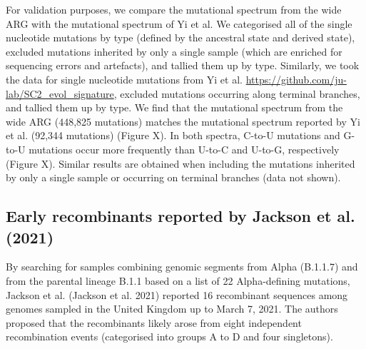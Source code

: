 \documentclass{article}
\begin{document}
For validation purposes, we compare the mutational spectrum from the wide ARG
with the mutational spectrum of Yi et al. We categorised all of the single
nucleotide mutations by type (defined by the ancestral state and derived
state), excluded mutations inherited by only a single sample (which are
enriched for sequencing errors and artefacts), and tallied them up by type.
Similarly, we took the data for single nucleotide mutations from Yi et al.
\url{https://github.com/ju-lab/SC2_evol_signature}, excluded mutations
occurring along terminal branches, and tallied them up by type. We find that
the mutational spectrum from the wide ARG (448,825 mutations) matches the
mutational spectrum reported by Yi et al. (92,344 mutations) (Figure X). In
both spectra, C-to-U mutations and G-to-U mutations occur more frequently than
U-to-C and U-to-G, respectively (Figure X). Similar results are obtained when
including the mutations inherited by only a single sample or occurring on
terminal branches (data not shown).


\subsection{Early recombinants reported by Jackson et al. (2021)}

By searching for samples combining genomic segments from Alpha (B.1.1.7) and
from the parental lineage B.1.1 based on a list of 22 Alpha-defining mutations,
Jackson et al. (Jackson et al. 2021) reported 16 recombinant sequences among
genomes sampled in the United Kingdom up to March 7, 2021. The authors proposed
that the recombinants likely arose from eight independent recombination events
(categorised into groups A to D and four singletons).
\end{document}

